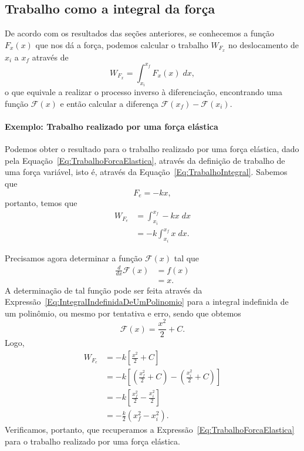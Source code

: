 \subsection{Trabalho como a integral da força}

De acordo com os resultados das seções anteriores, se conhecemos a função $F_x(x)$ que nos dá a força, podemos calcular o trabalho $W_{F_x}$ no deslocamento de $x_i$ a $x_f$ através de
\begin{equation}\label{Eq:TrabalhoIntegral}
    W_{F_x} = \int_{x_i}^{x_f} F_x(x) \;dx,
\end{equation}
%
o que equivale a realizar o processo inverso à diferenciação, encontrando uma função $\mathcal{F}(x)$ e então calcular a diferença $\mathcal{F}(x_f) - \mathcal{F}(x_i)$. 

\paragraph{Exemplo: Trabalho realizado por uma força elástica}

Podemos obter o resultado para o trabalho realizado por uma força elástica, dado pela Equação~\eqref{Eq:TrabalhoForcaElastica}, através da definição de trabalho de uma força variável, isto é, através da Equação~\eqref{Eq:TrabalhoIntegral}. Sabemos que
\begin{equation}
    F_e = - k x,
\end{equation}
%
portanto, temos que
\begin{align}
    W_{F_e} &= \int_{x_i}^{x_f} -kx\;dx \\
    &= -k \int_{x_i}^{x_f} x \;dx.
\end{align}

Precisamos agora determinar a função $\mathcal{F}(x)$ tal que
\begin{align}
   \frac{d}{dx}\mathcal{F}(x) &= f(x) \\
    & = x.
\end{align}
%
A determinação de tal função pode ser feita através da Expressão~\ref{Eq:IntegralIndefinidaDeUmPolinomio} para a integral indefinida de um polinômio, ou mesmo por tentativa e erro, sendo que obtemos
\begin{equation}
    \mathcal{F}(x) = \frac{x^2}{2} + C.
\end{equation}
%
Logo,
\begin{align}
    W_{F_e} &= -k \left[\frac{x^2}{2} + C\right] \\
    &= -k \left[\left(\frac{x_f^2}{2} + C\right) - \left(\frac{x_i^2}{2} + C\right)\right] \\
    &= -k \left[\frac{x_f^2}{2} - \frac{x_i^2}{2}\right] \\
    &= -\frac{k}{2} (x_f^2 - x_i^2).
\end{align}
%
Verificamos, portanto, que recuperamos a Expressão~\eqref{Eq:TrabalhoForcaElastica} para o trabalho realizado por uma força elástica.

